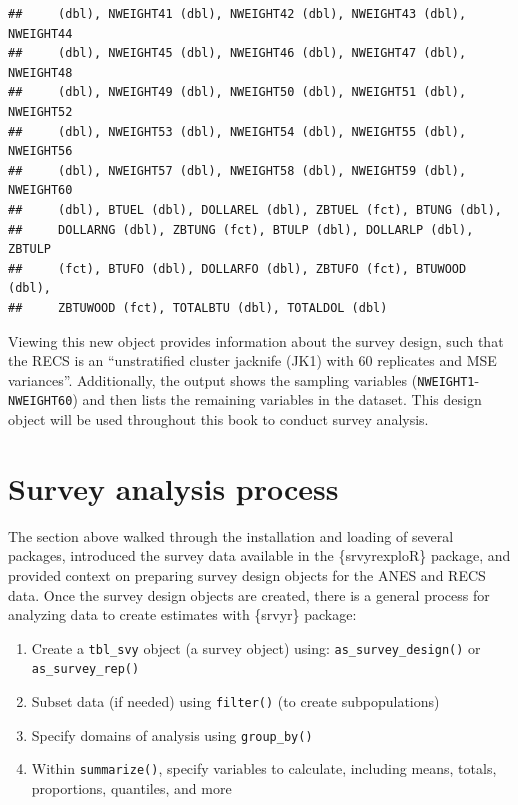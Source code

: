 \documentclass[
]{krantz}
\begin{document}
\begin{verbatim}
##     (dbl), NWEIGHT41 (dbl), NWEIGHT42 (dbl), NWEIGHT43 (dbl), NWEIGHT44
##     (dbl), NWEIGHT45 (dbl), NWEIGHT46 (dbl), NWEIGHT47 (dbl), NWEIGHT48
##     (dbl), NWEIGHT49 (dbl), NWEIGHT50 (dbl), NWEIGHT51 (dbl), NWEIGHT52
##     (dbl), NWEIGHT53 (dbl), NWEIGHT54 (dbl), NWEIGHT55 (dbl), NWEIGHT56
##     (dbl), NWEIGHT57 (dbl), NWEIGHT58 (dbl), NWEIGHT59 (dbl), NWEIGHT60
##     (dbl), BTUEL (dbl), DOLLAREL (dbl), ZBTUEL (fct), BTUNG (dbl),
##     DOLLARNG (dbl), ZBTUNG (fct), BTULP (dbl), DOLLARLP (dbl), ZBTULP
##     (fct), BTUFO (dbl), DOLLARFO (dbl), ZBTUFO (fct), BTUWOOD (dbl),
##     ZBTUWOOD (fct), TOTALBTU (dbl), TOTALDOL (dbl)
\end{verbatim}

Viewing this new object provides information about the survey design, such that the RECS is an ``unstratified cluster jacknife (JK1) with 60 replicates and MSE variances''. Additionally, the output shows the sampling variables (\texttt{NWEIGHT1}-\texttt{NWEIGHT60}) and then lists the remaining variables in the dataset. This design object will be used throughout this book to conduct survey analysis.

\hypertarget{survey-analysis-process}{%
\section{Survey analysis process}\label{survey-analysis-process}}

The section above walked through the installation and loading of several packages, introduced the survey data available in the \{srvyrexploR\} package, and provided context on preparing survey design objects for the ANES and RECS data. Once the survey design objects are created, there is a general process for analyzing data to create estimates with \{srvyr\} package:

\begin{enumerate}
\def\labelenumi{\arabic{enumi}.}
\item
  Create a \texttt{tbl\_svy} object (a survey object) using: \texttt{as\_survey\_design()} or \texttt{as\_survey\_rep()}
\item
  Subset data (if needed) using \texttt{filter()} (to create subpopulations)
\item
  Specify domains of analysis using \texttt{group\_by()}
\item
  Within \texttt{summarize()}, specify variables to calculate, including means, totals, proportions, quantiles, and more
\end{enumerate}
\end{document}
